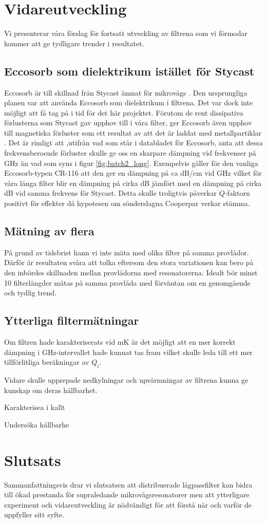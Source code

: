 \documentclass[main.tex]{subfiles}
\begin{document}
\section{Vidareutveckling}
Vi presenterar våra förslag för fortsatt utveckling av filtrena som vi förmodar kommer att ge tydligare trender i resultatet.

\subsection{Eccosorb som dielektrikum istället för Stycast}
Eccosorb är till skillnad från Stycast ämnat för mikrovågs . Den ursprungliga planen var att använda Eccosorb som dielektrikum i filtrena. Det var dock inte möjligt att få tag på i tid för det här projektet. Förutom de rent dissipativa förlusterna som Stycast gav upphov till i våra filter, ger Eccosorb även upphov till magnetiska förluster som ett resultat av att det är laddat med metallpartiklar \cite{Eccosorb}. Det är rimligt att ,utifrån vad som står i databladet för Eccosorb, anta att dessa frekvensberoende förluster skulle ge oss en skarpare dämpning vid frekvenser på \unit[8-50]{GHz} än vad som syns i figur \ref{fig:batch2_long}. Exempelvis gäller för den vanliga Eccosorb-typen CR-116 att den ger en dämpning på ca \unit[57]{dB/cm} vid \unit[18]{GHz} \cite{Eccosorb} vilket för våra långa filter blir en dämpning på cirka \unit[150]{dB} jämfört med en dämpning på cirka \unit[10]{dB} vid samma frekvens för Stycast. Detta skulle troligtvis påverkar $Q$-faktorn positivt för effekter då hypotesen om sönderslagna Cooperpar verkar stämma.
\subsection{Mätning av flera }
På grund av tidsbrist hann vi inte mäta med olika filter på samma provlådor. Därför är resultaten svåra att tolka eftersom den stora variationen kan bero på den inbördes skillnaden mellan provlådorna med resonatorerna. Idealt bör minst 10 filterlängder mätas på samma provlåda med förväntan om en genomgående och tydlig trend.
\subsection{Ytterliga filtermätningar}
Om filtren hade karakteriserats vid \unit[10]{mK} är det möjligt att en mer korrekt dämpning i \unit[4-8]{GHz}-intervallet hade kunnat tas fram vilket skulle leda till ett mer tillförlitliga beräkningar av $Q_i$.

Vidare skulle upprepade nedkylningar och upvärmningar av filtrena kunna ge kunskap om deras hållbarhet.

Karakterisea i kallt

Undersöka hållbarhe


\section{Slutsats}
Sammanfattningsvis drar vi slutsatsen att distribuerade lågpassfilter kan bidra till ökad prestanda för supraledande mikrovågsresonatorer men att ytterligare experiment och vidareutveckling är nödvändigt för att förstå när och varför de uppfyller sitt syfte.
\end{document}

